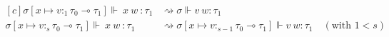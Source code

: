 
\begin{figure}
\begin{center}
\tiny
\begin{equation*}
  \begin{aligned}[c]
    \sigma[x \mapsto v :_1 \tau_0 \multimap \tau_1] \Vdash \ x \ w \ : \tau_1 &\rightsquigarrow
    \sigma \Vdash v \ w : \tau_1 \\
    \sigma[x \mapsto v :_{s} \tau_0 \multimap \tau_1] \Vdash \ x \ w \ : \tau_1
    &\rightsquigarrow \sigma[x \mapsto v :_{s-1} \tau_0 \multimap \tau_1] \Vdash
    v \ w : \tau_1 \quad{(\text{with } 1 < s)} \\

\end{aligned}
\end{equation*}
\end{center}
\end{figure}
